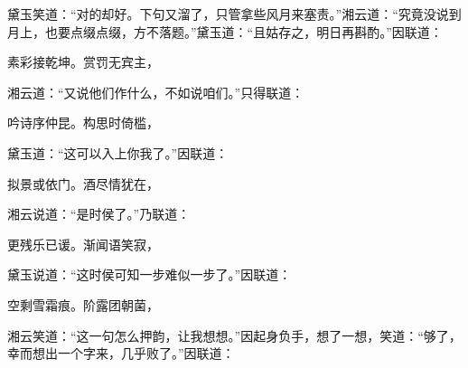\begin{parag}

    黛玉笑道：“对的却好。下句又溜了，只管拿些风月来塞责。”湘云道：“究竟没说到月上，也要点缀点缀，方不落题。”黛玉道：“且姑存之，明日再斟酌。”因联道：
\end{parag}
\begin{poem}
    \begin{pl}
        素彩接乾坤。赏罚无宾主，
    \end{pl}
\end{poem}
\begin{parag}

    湘云道：“又说他们作什么，不如说咱们。”只得联道：
\end{parag}
\begin{poem}
    \begin{pl}
        吟诗序仲昆。构思时倚槛，
    \end{pl}
\end{poem}
\begin{parag}

    黛玉道：“这可以入上你我了。”因联道：
\end{parag}

\begin{poem}
    \begin{pl}
        拟景或依门。酒尽情犹在，
    \end{pl}
\end{poem}

\begin{parag}

    湘云说道：“是时侯了。”乃联道：
\end{parag}

\begin{poem}
    \begin{pl}
        更残乐已谖。渐闻语笑寂，
    \end{pl}
\end{poem}

\begin{parag}

    黛玉说道：“这时侯可知一步难似一步了。”因联道：
\end{parag}
\begin{poem}
    \begin{pl}
        空剩雪霜痕。阶露团朝菌，
    \end{pl}
\end{poem}
\begin{parag}

    湘云笑道：“这一句怎么押韵，让我想想。”因起身负手，想了一想，笑道：“够了，幸而想出一个字来，几乎败了。”因联道：
\end{parag}

